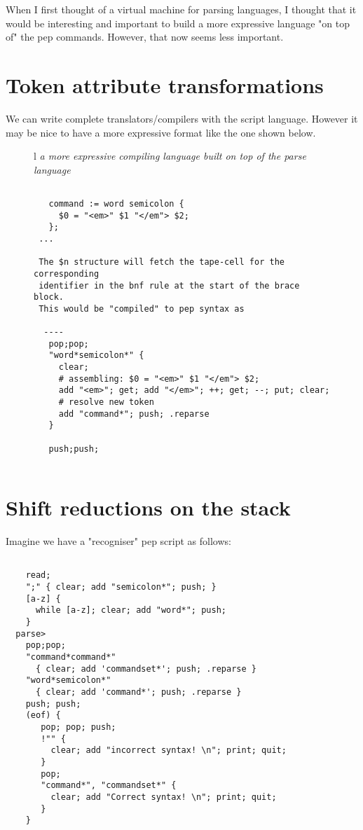\documentclass[a4paper,12pt]{article}
\begin{document}
  When I first thought of a virtual machine for parsing languages,
  I thought that it would be interesting and important to build
  a more expressive language "on top of" the pep commands. However,
  that now seems less important.

\section{Token attribute transformations}

 We can write complete translators/compilers with the script language.
 However it may be nice to have a more expressive format like the one shown
 below.
 \begin{figure}
 \begin{tabular}{ l }
 \emph{ a more expressive compiling language built on top of the parse language } \\ 
 \begin{lstlisting}[breaklines] 

   command := word semicolon {
     $0 = "<em>" $1 "</em"> $2;
   };
 ...
   
 The $n structure will fetch the tape-cell for the corresponding 
 identifier in the bnf rule at the start of the brace block.
 This would be "compiled" to pep syntax as 

  ----
   pop;pop;
   "word*semicolon*" {
     clear; 
     # assembling: $0 = "<em>" $1 "</em"> $2;
     add "<em>"; get; add "</em>"; ++; get; --; put; clear;
     # resolve new token 
     add "command*"; push; .reparse
   }

   push;push;
  
 \end{lstlisting} 
 \end{tabular} 

 \end{figure}


\section{Shift reductions on the stack}

  Imagine we have a "recogniser" pep script as follows: 
 \begin{lstlisting}[breaklines] 

    read; 
    ";" { clear; add "semicolon*"; push; }
    [a-z] { 
      while [a-z]; clear; add "word*"; push; 
    } 
  parse>
    pop;pop;
    "command*command*" 
      { clear; add 'commandset*'; push; .reparse }
    "word*semicolon*" 
      { clear; add 'command*'; push; .reparse }      
    push; push;
    (eof) { 
       pop; pop; push; 
       !"" { 
         clear; add "incorrect syntax! \n"; print; quit;
       }
       pop;
       "command*", "commandset*" {
         clear; add "Correct syntax! \n"; print; quit;
       }
    }
  
 \end{lstlisting} 
\end{document}
